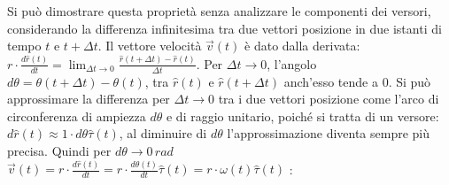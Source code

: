 \documentclass{article}
\numberwithin{equation}{subsection}
\begin{document}
\begin{center}\end{center}

Si può dimostrare questa proprietà senza analizzare le componenti 
dei versori, considerando la differenza infinitesima tra due 
vettori posizione in due istanti di tempo $t$ e $t+\Delta t$.
Il vettore velocità $\vec{v}(t)$ è dato dalla derivata: 
$r\cdot\displaystyle\frac{d\hat{r}(t)}{dt}=\lim_{\Delta t \to 0}\frac{\hat{r}(t+\Delta t)-\hat{r}(t)}{\Delta t}$. Per $\Delta t \to 0$, 
l'angolo $d\theta = \theta(t+\Delta t)-\theta(t)$, tra $\hat{r}(t)$ e $\hat{r}(t+\Delta t)$  
anch'esso tende a $0$. Si può approssimare la differenza per 
$\Delta t \to 0$ tra i due vettori posizione come l'arco di circonferenza di ampiezza $d\theta$ e di raggio unitario, poiché si tratta di un versore: $d\hat{r}(t)\approx1\cdot d\theta\hat\tau(t)$, al diminuire di $d\theta$ 
l'approssimazione diventa sempre più precisa. 
Quindi per $d\theta\to0\,rad$ $\vec{v}(t)=r\cdot\displaystyle\frac{d\hat{r}(t)}{dt}=r\cdot\frac{d\theta(t)}{dt}\hat{\tau}(t)=r\cdot\omega(t)\hat{\tau}(t)$ :
\end{document}
